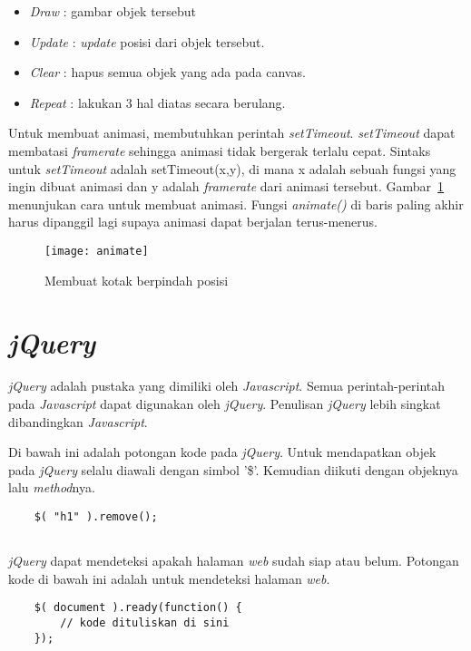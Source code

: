 \begin{itemize}
	\item \textit{Draw} : gambar objek tersebut
	\item \textit{Update} : \textit{update} posisi dari objek tersebut.
	\item \textit{Clear} : hapus semua objek yang ada pada canvas.
	\item \textit{Repeat} : lakukan 3 hal diatas secara berulang.
\end{itemize}

Untuk membuat animasi, membutuhkan perintah \textit{setTimeout}. \textit{setTimeout} dapat membatasi \textit{framerate} sehingga animasi tidak bergerak terlalu cepat. Sintaks untuk \textit{setTimeout} adalah setTimeout(x,y), di mana x adalah sebuah fungsi yang ingin dibuat animasi dan y adalah \textit{framerate} dari animasi tersebut. Gambar~\ref{fig:animate} menunjukan cara untuk membuat animasi. Fungsi \textit{animate()} di baris paling akhir harus dipanggil lagi supaya animasi dapat berjalan terus-menerus.

\begin{figure}[H]
	\centering  
	\texttt{[image: animate]}
	\caption[Membuat kotak berpindah posisi]{Membuat kotak berpindah posisi}
	\label{fig:animate} 
\end{figure} 

\section{\textit{jQuery}}
\textit{jQuery} adalah pustaka yang dimiliki oleh \textit{Javascript}. Semua perintah-perintah pada \textit{Javascript} dapat digunakan oleh \textit{jQuery}. Penulisan \textit{jQuery} lebih singkat dibandingkan \textit{Javascript}.

Di bawah ini adalah potongan kode pada \textit{jQuery}. Untuk mendapatkan objek pada \textit{jQuery} selalu diawali dengan simbol '\$'. Kemudian diikuti dengan objeknya lalu \textit{method}nya. 

\begin{lstlisting}
	$( "h1" ).remove();
	
\end{lstlisting}

\textit{jQuery} dapat mendeteksi apakah halaman \textit{web} sudah siap atau belum. Potongan kode di bawah ini adalah untuk mendeteksi halaman \textit{web}.

\begin{lstlisting}
	$( document ).ready(function() {
    	// kode dituliskan di sini
	});
	
\end{lstlisting}

